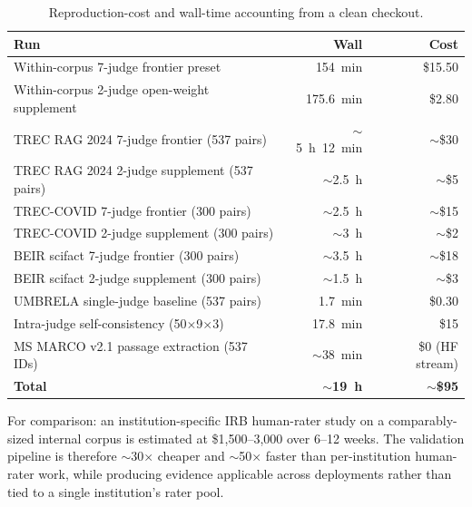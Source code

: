 \documentclass{article}
\begin{document}
\begin{table}[h]
\centering\small
\caption{Reproduction-cost and wall-time accounting from a clean checkout.}
\label{tab:cost}
\begin{tabular}{@{}lrr@{}}
\toprule
Run & Wall & Cost \\
\midrule
Within-corpus 7-judge frontier preset & 154~min & \$15.50 \\
Within-corpus 2-judge open-weight supplement & 175.6~min & \$2.80 \\
TREC RAG 2024 7-judge frontier (537 pairs) & $\sim$5~h~12~min & $\sim$\$30 \\
TREC RAG 2024 2-judge supplement (537 pairs) & $\sim$2.5~h & $\sim$\$5 \\
TREC-COVID 7-judge frontier (300 pairs) & $\sim$2.5~h & $\sim$\$15 \\
TREC-COVID 2-judge supplement (300 pairs) & $\sim$3~h & $\sim$\$2 \\
BEIR scifact 7-judge frontier (300 pairs) & $\sim$3.5~h & $\sim$\$18 \\
BEIR scifact 2-judge supplement (300 pairs) & $\sim$1.5~h & $\sim$\$3 \\
UMBRELA single-judge baseline (537 pairs) & 1.7~min & \$0.30 \\
Intra-judge self-consistency (50$\times$9$\times$3) & 17.8~min & \$15 \\
MS MARCO v2.1 passage extraction (537 IDs) & $\sim$38~min & \$0 (HF stream) \\
\midrule
\textbf{Total} & $\sim$\textbf{19~h} & $\sim$\textbf{\$95} \\
\bottomrule
\end{tabular}
\end{table}

For comparison: an institution-specific IRB human-rater study on a comparably-sized internal corpus is estimated at \$1{,}500--3{,}000 over 6--12 weeks. The validation pipeline is therefore $\sim$30$\times$ cheaper and $\sim$50$\times$ faster than per-institution human-rater work, while producing evidence applicable across deployments rather than tied to a single institution's rater pool.
\end{document}
